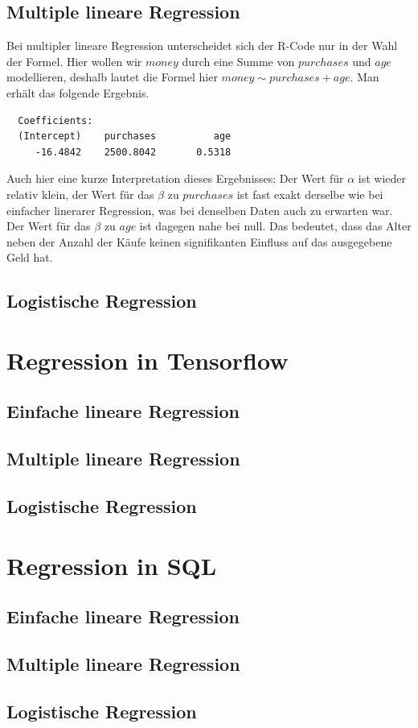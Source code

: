 \subsection{Multiple lineare Regression}

Bei multipler lineare Regression unterscheidet sich der R-Code nur in der Wahl der Formel. Hier wollen wir $money$ durch eine Summe von $purchases$ und $age$ modellieren, deshalb lautet die Formel hier $money \sim purchases + age$. Man erhält das folgende Ergebnis.

\begin{lstlisting}
  Coefficients:
  (Intercept)    purchases          age
     -16.4842    2500.8042       0.5318
\end{lstlisting}

Auch hier eine kurze Interpretation dieses Ergebnisses: Der Wert für $\alpha$ ist wieder relativ klein, der Wert für das $\beta$ zu $purchases$ ist fast exakt derselbe wie bei einfacher linerarer Regression, was bei denselben Daten auch zu erwarten war. Der Wert für das $\beta$ zu $age$ ist dagegen nahe bei null. Das bedeutet, dass das Alter neben der Anzahl der Käufe keinen signifikanten Einfluss auf das ausgegebene Geld hat.

\subsection{Logistische Regression}

\section{Regression in Tensorflow}

\subsection{Einfache lineare Regression}

\subsection{Multiple lineare Regression}

\subsection{Logistische Regression}

\section{Regression in SQL}

\subsection{Einfache lineare Regression}

\subsection{Multiple lineare Regression}

\subsection{Logistische Regression}
